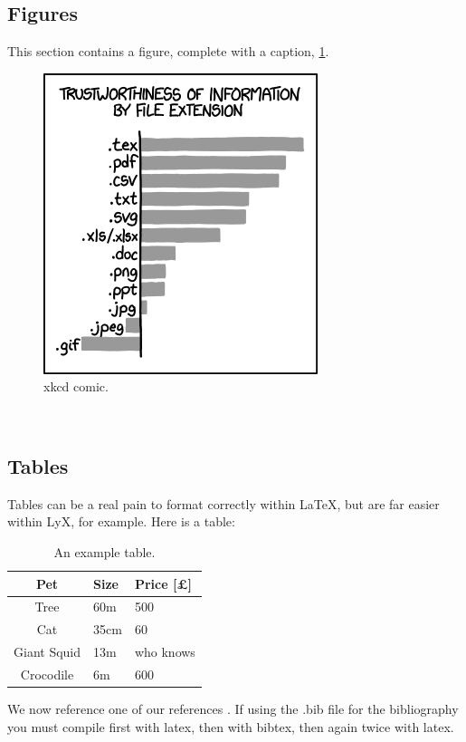 \documentclass[a4paper,12pt]{article}
\begin{document}
\subsection{Figures}
This section contains a figure, complete with a caption, \ref{fig:comic}.
\begin{figure}
\centering
  \includegraphics[scale=0.8]{file_extensions.png}
  \caption{xkcd comic.}
  \label{fig:comic}
\end{figure}
\\
\newpage
\subsection{Tables}
Tables can be a real pain to format correctly within \LaTeX{}, but are far easier within LyX, for example. Here is a table:\\

\begin{table}[htb]
\caption{An example table.}
\label{tab:tab1}
\centering
	\begin{tabular}{c|l|l}
	Pet & Size & Price [\pounds] \\ 	
	\hline
	Tree & 60m  & 500 \\
	Cat & 35cm& 60 \\
	Giant Squid & 13m & who knows \\
	Crocodile & 6m & 600 \\
	\end{tabular}
\end{table}

\noindent
We now reference one of our references \cite{LeVeque}. If using the .bib file for the bibliography you must compile first with latex, then with bibtex, then again twice with latex.
\end{document}
